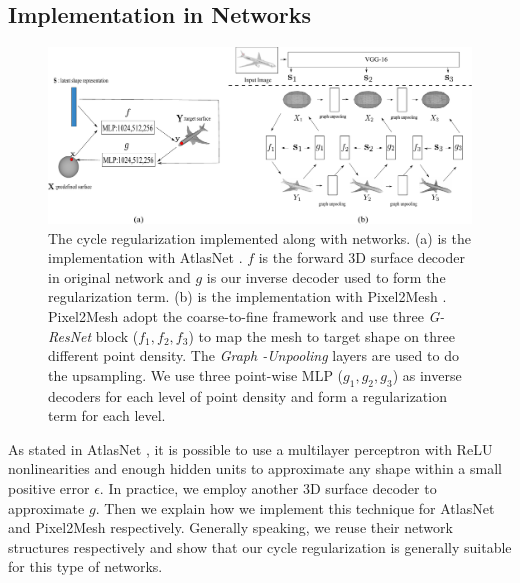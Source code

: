 \subsection{Implementation in Networks}
\begin{figure}[t]
	\centering
	\includegraphics[width=\linewidth]{img/net/net}
	\caption{The cycle regularization implemented along with networks. (a) is the implementation with AtlasNet \cite{atlasnet}. $f$ is the forward 3D surface decoder in original network and $g$ is our inverse decoder used to form the regularization term. (b) is the implementation with Pixel2Mesh \cite{pixel2mesh}.  Pixel2Mesh \cite{pixel2mesh} adopt the coarse-to-fine framework and use three \emph{G-ResNet} block ($f_1,f_2,f_3$) to map the mesh to target shape on three different point density. The \emph{Graph -Unpooling} layers are used to do the upsampling. We use three point-wise MLP ($g_1,g_2,g_3$) as inverse decoders for each level of point density and form a regularization term for each level.}
	\label{fig:net}
\end{figure}
As stated in AtlasNet \cite{atlasnet}, it is possible to use a multilayer perceptron with ReLU nonlinearities and enough hidden units to approximate any shape within a small positive error $\epsilon$. In practice, we employ another 3D surface decoder to approximate $g$. Then we explain how we implement this technique for AtlasNet and Pixel2Mesh respectively. Generally speaking, we reuse their network structures respectively and show that our cycle regularization is generally suitable for this type of networks.

